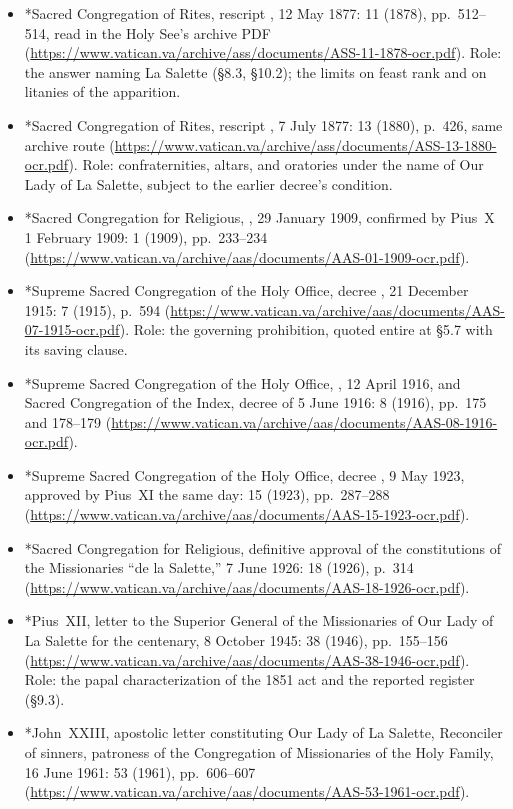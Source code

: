 \begin{itemize}
\item *Sacred Congregation of Rites, rescript ,
12 May 1877:  11 (1878), pp.~512--514, read
in the Holy See's archive PDF
(\url{https://www.vatican.va/archive/ass/documents/ASS-11-1878-ocr.pdf}).
Role: the  answer naming La Salette (\S8.3,
\S10.2); the limits on feast rank and on litanies of the apparition.
\item *Sacred Congregation of Rites, rescript , 7
July 1877:  13 (1880), p.~426, same archive
route
(\url{https://www.vatican.va/archive/ass/documents/ASS-13-1880-ocr.pdf}).
Role: confraternities, altars, and oratories under the name of Our
Lady of La Salette, subject to the earlier decree's condition.
\item *Sacred Congregation for Religious, , 29 January 1909, confirmed by
Pius~X 1 February 1909:  1 (1909),
pp.~233--234
(\url{https://www.vatican.va/archive/aas/documents/AAS-01-1909-ocr.pdf}).
\item *Supreme Sacred Congregation of the Holy Office, decree
, 21 December 1915:
 7 (1915), p.~594
(\url{https://www.vatican.va/archive/aas/documents/AAS-07-1915-ocr.pdf}).
Role: the governing prohibition, quoted entire at \S5.7 with its
saving clause.
\item *Supreme Sacred Congregation of the Holy Office,
, 12 April 1916, and Sacred
Congregation of the Index, decree of 5 June 1916:  8 (1916), pp.~175 and 178--179
(\url{https://www.vatican.va/archive/aas/documents/AAS-08-1916-ocr.pdf}).
\item *Supreme Sacred Congregation of the Holy Office, decree
, 9 May 1923, approved by Pius~XI the same
day:  15 (1923), pp.~287--288
(\url{https://www.vatican.va/archive/aas/documents/AAS-15-1923-ocr.pdf}).
\item *Sacred Congregation for Religious, definitive approval of the
constitutions of the Missionaries ``de la Salette,'' 7 June 1926:
 18 (1926), p.~314
(\url{https://www.vatican.va/archive/aas/documents/AAS-18-1926-ocr.pdf}).
\item *Pius~XII, letter to the Superior General of the Missionaries
of Our Lady of La Salette for the centenary, 8 October 1945:
 38 (1946), pp.~155--156
(\url{https://www.vatican.va/archive/aas/documents/AAS-38-1946-ocr.pdf}).
Role: the papal characterization of the 1851 act and the reported
register (\S9.3).
\item *John~XXIII, apostolic letter constituting Our Lady of La
Salette, Reconciler of sinners, patroness of the Congregation of
Missionaries of the Holy Family, 16 June 1961:  53 (1961), pp.~606--607
(\url{https://www.vatican.va/archive/aas/documents/AAS-53-1961-ocr.pdf}).
\end{itemize}

